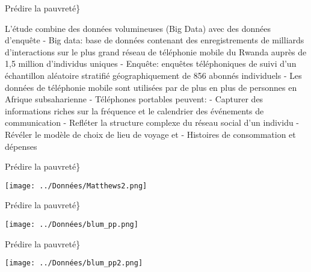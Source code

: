 \documentclass[
  ignorenonframetext,
]{beamer}
\begin{document}
\begin{frame}{Prédire la pauvreté\}}
\protect\hypertarget{pruxe9dire-la-pauvretuxe9-1}{}

L'étude combine des données volumineuses (Big Data) avec des données
d'enquête - Big data: base de données contenant des enregistrements de
milliards d'interactions sur le plus grand réseau de téléphonie mobile
du Rwanda auprès de 1,5 million d'individus uniques - Enquête: enquêtes
téléphoniques de suivi d'un échantillon aléatoire stratifié
géographiquement de 856 abonnés individuels - Les données de téléphonie
mobile sont utilisées par de plus en plus de personnes en Afrique
subsaharienne - Téléphones portables peuvent: - Capturer des
informations riches sur la fréquence et le calendrier des événements de
communication - Refléter la structure complexe du réseau social d'un
individu - Révéler le modèle de choix de lieu de voyage et - Histoires
de consommation et dépenses

\end{frame}

\begin{frame}{Prédire la pauvreté\}}
\protect\hypertarget{pruxe9dire-la-pauvretuxe9-2}{}

\texttt{[image: ../Données/Matthews2.png]}

\end{frame}

\begin{frame}{Prédire la pauvreté\}}
\protect\hypertarget{pruxe9dire-la-pauvretuxe9-3}{}

\texttt{[image: ../Données/blum\_pp.png]}

\end{frame}

\begin{frame}{Prédire la pauvreté\}}
\protect\hypertarget{pruxe9dire-la-pauvretuxe9-4}{}

\texttt{[image: ../Données/blum\_pp2.png]}

\end{frame}
\end{document}

